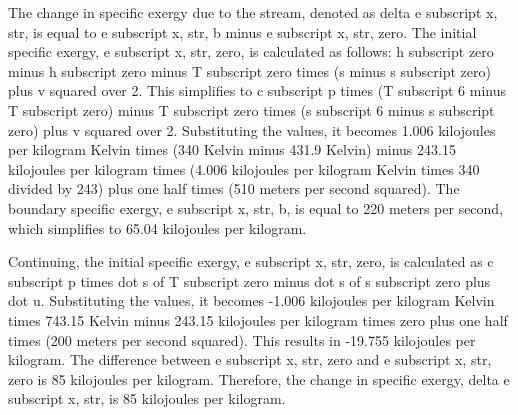 The change in specific exergy due to the stream, denoted as delta e subscript x, str, is equal to e subscript x, str, b minus e subscript x, str, zero. The initial specific exergy, e subscript x, str, zero, is calculated as follows: h subscript zero minus h subscript zero minus T subscript zero times (s minus s subscript zero) plus v squared over 2. This simplifies to c subscript p times (T subscript 6 minus T subscript zero) minus T subscript zero times (s subscript 6 minus s subscript zero) plus v squared over 2. Substituting the values, it becomes 1.006 kilojoules per kilogram Kelvin times (340 Kelvin minus 431.9 Kelvin) minus 243.15 kilojoules per kilogram times (4.006 kilojoules per kilogram Kelvin times 340 divided by 243) plus one half times (510 meters per second squared). The boundary specific exergy, e subscript x, str, b, is equal to 220 meters per second, which simplifies to 65.04 kilojoules per kilogram.

Continuing, the initial specific exergy, e subscript x, str, zero, is calculated as c subscript p times dot s of T subscript zero minus dot s of s subscript zero plus dot u. Substituting the values, it becomes -1.006 kilojoules per kilogram Kelvin times 743.15 Kelvin minus 243.15 kilojoules per kilogram times zero plus one half times (200 meters per second squared). This results in -19.755 kilojoules per kilogram. The difference between e subscript x, str, zero and e subscript x, str, zero is 85 kilojoules per kilogram. Therefore, the change in specific exergy, delta e subscript x, str, is 85 kilojoules per kilogram.